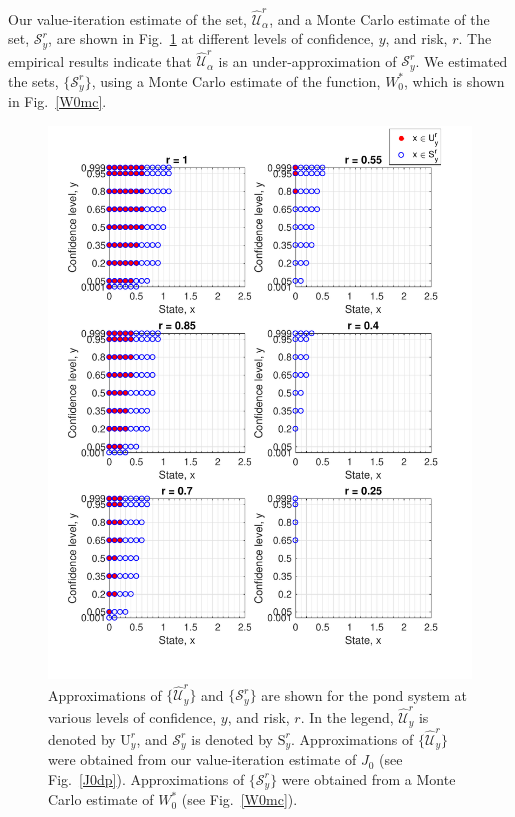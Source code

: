 \documentclass[letterpaper, 10 pt, conference]{ieeeconf}  %
\begin{document}
Our value-iteration estimate of the set, $\widehat{\mathcal{U}}_{\alpha}^r$, and a Monte Carlo estimate of the set, $\mathcal{S}_y^r$, are shown in Fig.~\ref{compare}
at different levels of confidence, $y$, and risk, $r$. 
The empirical results indicate that $\widehat{\mathcal{U}}_{\alpha}^r$ is an under-approximation of $\mathcal{S}_y^r$.
We estimated the sets, $\{\mathcal{S}_y^r\}$, using a Monte Carlo estimate of the function, $W_0^*$, which is shown in Fig.~\ref{W0mc}.

\begin{figure}[thpb]
      \centering
      \includegraphics[scale=0.5]{output_CompareScript_Sept112018.pdf}
      \caption{ Approximations of $\{\widehat{\mathcal{U}}_y^r\}$ and $\{\mathcal{S}_y^r\}$ are shown for the pond system at various levels of confidence, $y$, and risk, $r$. In the legend,  $\widehat{\mathcal{U}}_y^r$ is denoted by $\text{U}_y^r$, and $\mathcal{S}_y^r$ is denoted by $\text{S}_y^r$.
	  Approximations of $\{\widehat{\mathcal{U}}_y^r\}$ were obtained from our value-iteration estimate of $J_0$ (see Fig.~\ref{J0dp}).
	  Approximations of $\{\mathcal{S}_y^r\}$ were obtained from a Monte Carlo estimate of $W_0^*$ (see Fig.~\ref{W0mc}).} 
      \label{compare}
\end{figure}
\end{document}
